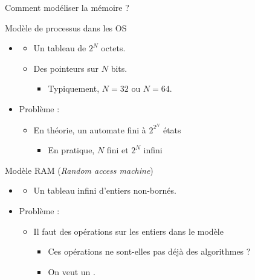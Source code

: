 
\begingroup

\begin{frame}{Comment modéliser la mémoire ?}

  \begin{block}{Modèle de processus dans les OS}
    \begin{itemize}
    \item {}
      \begin{itemize}
      \item Un tableau de $2^N$ octets.
      \item Des pointeurs sur $N$ bits.
        \begin{itemize}
        \item Typiquement, $N=32$ ou $N=64$.
        \end{itemize}
      \end{itemize}
    \item \alert{Problème :} 
      \begin{itemize}
      \item En théorie, un automate fini à $2^{2^N}$ états
        \begin{itemize}
        \item En pratique, $N$ fini et $2^N$ infini
        \end{itemize}
      \end{itemize}
    \end{itemize}
  \end{block}

  \pause

  \begin{block}{Modèle RAM (\emph{Random access machine})}
    \begin{itemize}
    \item {}
      \begin{itemize}
      \item Un tableau infini d'entiers non-bornés.
      \end{itemize}
    \item \alert{Problème :} 
      \begin{itemize}
      \item Il faut des opérations sur les entiers dans le modèle
        \begin{itemize}
        \item Ces opérations ne sont-elles pas déjà des algorithmes ?
        \item On veut un .
        \end{itemize}
      \end{itemize}
    \end{itemize}
  \end{block}

\end{frame}

\endgroup
